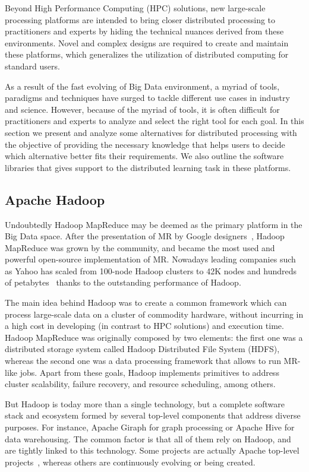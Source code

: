 \documentclass[3p,review]{elsarticle}
\begin{document}
Beyond High Performance Computing (HPC) solutions, new large-scale processing platforms are intended to bring closer distributed processing to practitioners and experts by hiding the technical nuances derived from these environments. Novel and complex designs are required to create and maintain these platforms, which generalizes the utilization of distributed computing for standard users. 

As a result of the fast evolving of Big Data environment, a myriad of tools, paradigms and techniques have surged to tackle different use cases in industry and science. However, because of the myriad of tools, it is often difficult for practitioners and experts to analyze and select the right tool for each goal. In this section we present and analyze some alternatives for distributed processing with the objective of providing the necessary knowledge that helps users to decide which alternative better fits their requirements. We also outline the software libraries that gives support to the distributed learning task in these platforms.

\subsection{Apache Hadoop}\label{subsec:hadoop}

Undoubtedly Hadoop MapReduce may be deemed as the primary platform in the Big Data space. After the presentation of MR by Google designers~\cite{dean04}, Hadoop MapReduce was grown by the community, and became the most used and powerful open-source implementation of MR. Nowadays leading companies such as Yahoo has scaled from 100-node Hadoop clusters to 42K nodes and hundreds of petabytes~\cite{harris13} thanks to the outstanding performance of Hadoop. 

The main idea behind Hadoop was to create a common framework which can process large-scale data on a cluster of commodity hardware, without incurring in a high cost in developing (in contrast to HPC solutions) and execution time. Hadoop MapReduce was originally composed by two elements: the first one was a distributed storage system called Hadoop Distributed File System (HDFS), whereas the second one was a data processing framework that allows to run MR-like jobs. Apart from these goals, Hadoop implements primitives to address cluster scalability, failure recovery, and resource scheduling, among others.

But Hadoop is today more than a single technology, but a complete software stack and ecosystem formed by several top-level components that address diverse purposes. For instance, Apache Giraph for graph processing or Apache Hive for data warehousing. The common factor is that all of them rely on Hadoop, and are tightly linked to this technology. Some projects are actually Apache top-level projects~\cite{apache}, whereas others are continuously evolving or being created.%
\end{document}
